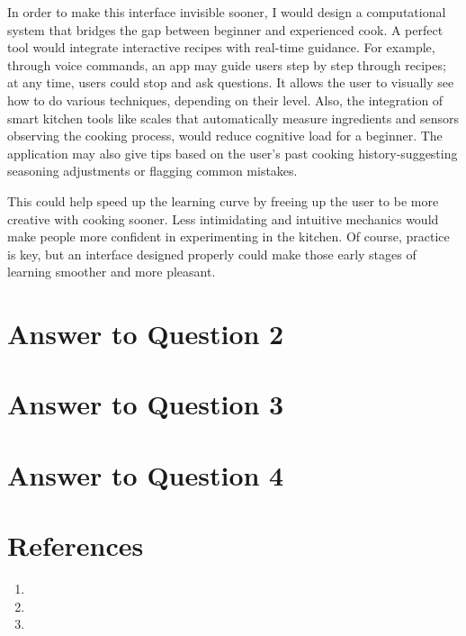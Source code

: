 \documentclass[
	letterpaper, %
]{jdf}
\begin{document}
In order to make this interface invisible sooner, I would design a computational system that bridges the gap between beginner and experienced cook. A perfect tool would integrate interactive recipes with real-time guidance. For example, through voice commands, an app may guide users step by step through recipes; at any time, users could stop and ask questions. It allows the user to visually see how to do various techniques, depending on their level. Also, the integration of smart kitchen tools like scales that automatically measure ingredients and sensors observing the cooking process, would reduce cognitive load for a beginner. The application may also give tips based on the user's past cooking history-suggesting seasoning adjustments or flagging common mistakes.

This could help speed up the learning curve by freeing up the user to be more creative with cooking sooner. Less intimidating and intuitive mechanics would make people more confident in experimenting in the kitchen. Of course, practice is key, but an interface designed properly could make those early stages of learning smoother and more pleasant.
\newpage

\section{Answer to Question 2}
 
\newpage

\section{Answer to Question 3}
\subsection {}

\newpage

\section{Answer to Question 4}


\newpage

\section{References}

\printbibliography[heading=none]
\begin{enumerate}
    \item 
    \item 
    \item 

\end{enumerate}
\end{document}

